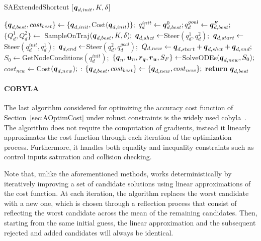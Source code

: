 \begin{algorithm}[h!]
    \caption{SAExtendedShortcut [$\boldsymbol{q}_{d,init}, K, \delta$]}\label{alg:extendedshct}
    \begin{algorithmic}[1]
        \State $\{\boldsymbol{q}_{d,best}, cost_{best}\} \gets \{\boldsymbol{q}_{d,init}, $Cost$(\boldsymbol{q}_{d,init})\};$
        \State $q_d^{init} \gets \boldsymbol{q}_{d,best}^0; q_d^{goal} \gets \boldsymbol{q}_{d,best}^F;$
            \State $\{Q_d^{1}, Q_d^{2}\} \gets$ SampleOnTraj$(\boldsymbol{q}_{d,best}, K, \delta);$
                    \State $\boldsymbol{q}_{d,shct} \gets $Steer$(q_d^{1}, q_d^{2});$
                        \State $\boldsymbol{q}_{d,start} \gets $Steer$(q_d^{init}, q_d^{1});$
                        \State $\boldsymbol{q}_{d,end} \gets $Steer$(q_d^{2}, q_d^{goal});$
                        \State $Q_{d,new} \gets \boldsymbol{q}_{d,start}+\boldsymbol{q}_{d,shct}+\boldsymbol{q}_{d,end};$
                    \EndIf
                \EndFor 
            \EndFor
                \State $S_0 \gets $GetNodeConditions$(q_d^{init});$
                \State $\{\boldsymbol{q}_n, \boldsymbol{u}_n, \boldsymbol{r_q}, \boldsymbol{r_u}, S_F\}  \gets $SolveODEs$(\boldsymbol{q}_{d,new}, S_0);$
                \State $cost_{new} \gets $Cost$(\boldsymbol{q}_{d,new});$
                :   
                        \State $\{\boldsymbol{q}_{d,best}, cost_{best}\} \gets \{\boldsymbol{q}_{d,new}, cost_{new}\};$
                    \EndIf
                \EndIf
            \EndFor 
        \EndWhile
    \State \textbf{return} $\boldsymbol{q}_{d,best}$
    \end{algorithmic}
\end{algorithm}

\paragraph{COBYLA}

The last algorithm considered for optimizing the accuracy cost function of Section~\ref{sec:AOptimCost} under robust constraints is the widely used \gls{cobyla}~\cite{cCOBYLA}.
The algorithm does not require the computation of gradients, instead it linearly approximates the cost function through each iteration of the optimization process.
Furthermore, it handles both equality and inequality constraints such as control inputs saturation and collision checking. 

Note that, unlike the aforementioned methods,  works deterministically by iteratively improving a set of candidate solutions using linear approximations of the cost function.
At each iteration, the algorithm replaces the worst candidate with a new one, which is chosen through a reflection process that consist of reflecting the worst candidate across the mean of the remaining candidates.
Then, starting from the same initial guess, the linear approximation and the subsequent rejected and added candidates will always be identical.

